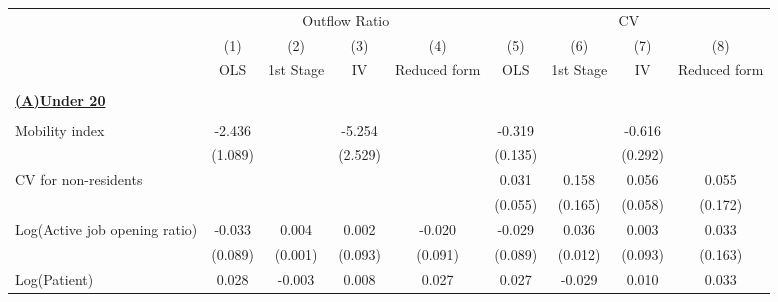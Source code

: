 \begin{tabular}{l*{8}{c}} \toprule
                    &\multicolumn{4}{c}{Outflow Ratio}                                                      &\multicolumn{4}{c}{CV}                                                                 \\\cmidrule(lr){2-5}\cmidrule(lr){6-9}
                    &\multicolumn{1}{c}{(1)}         &\multicolumn{1}{c}{(2)}         &\multicolumn{1}{c}{(3)}         &\multicolumn{1}{c}{(4)}         &\multicolumn{1}{c}{(5)}         &\multicolumn{1}{c}{(6)}         &\multicolumn{1}{c}{(7)}         &\multicolumn{1}{c}{(8)}         \\
                    &         OLS         &   1st Stage         &          IV         &Reduced form         &         OLS         &   1st Stage         &          IV         &Reduced form         \\
\hline \\ \multicolumn{9}{l}{\textbf{\underline{(A)Under 20}}} \\\\[-1ex]
Mobility index      &      -2.436\sym{**} &                     &      -5.254\sym{**} &                     &      -0.319\sym{**} &                     &      -0.616\sym{**} &                     \\
                    &     (1.089)         &                     &     (2.529)         &                     &     (0.135)         &                     &     (0.292)         &                     \\
\addlinespace
CV for non-residents&                     &                     &                     &                     &       0.031         &       0.158         &       0.056         &       0.055         \\
                    &                     &                     &                     &                     &     (0.055)         &     (0.165)         &     (0.058)         &     (0.172)         \\
\addlinespace
Log(Active job opening ratio)&      -0.033         &       0.004\sym{***}&       0.002         &      -0.020         &      -0.029         &       0.036\sym{***}&       0.003         &       0.033         \\
                    &     (0.089)         &     (0.001)         &     (0.093)         &     (0.091)         &     (0.089)         &     (0.012)         &     (0.093)         &     (0.163)         \\
\addlinespace
Log(Patient)        &       0.028         &      -0.003\sym{***}&       0.008         &       0.027         &       0.027         &      -0.029\sym{***}&       0.010         &       0.033         \\

\end{tabular}
